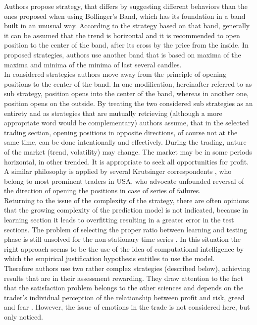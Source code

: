 \documentclass{tewiart}
\begin{document}
Authors propose strategy, that differs by suggesting different behaviors than the ones proposed when using Bollinger's Band, which has its foundation in a band built in an unusual way. According to the strategy based on that band, generally it can be assumed that the trend is horizontal and it is recommended to open position to the center of the band, after its cross by the price from the inside. In proposed strategies, authors use another band that is based on maxima of the maxima and minima of the minima of last several candles.\\

In considered strategies authors move away from the principle of opening positions to the center of the band. In one modification, hereinafter referred to as sub strategy, position opens into the center of the band, whereas in another one, position opens on the outside. By treating the two considered sub strategies as an entirety and as strategies that are mutually retrieving (although a more appropriate word would be complementary) authors assume, that in the selected trading section, opening positions in opposite directions, of course not at the same time, can be done intentionally and effectively. During the trading, nature of the market (trend, volatility) may change. The market may be in some periods horizontal, in other trended. It is appropriate to seek all opportunities for profit. A similar philosophy is applied by several Krutsinger correspondents \cite{Krutsinger}, who belong to most prominent traders in USA, who advocate unfounded reversal of the direction of opening the positions in case of series of failures.\\

Returning to the issue of the complexity of the strategy, there are often opinions that the growing complexity of the prediction model is not indicated, because in learning section it  leads to overfitting \cite{Murphy, Cai, Fujimoto}  resulting in a greater error in the test sections. The problem of selecting the proper ratio between learning and testing phase is still unsolved for the non-stationary time series \cite{Ball, Ivakhnenko}. In this situation the right approach seems to be the use of the idea of computational intelligence \cite{Polya, Pedrycz} by which the empirical justification hypothesis entitles to use the model.\\

Therefore authors use two rather complex strategies (described below), achieving results that are in their assessment rewarding. They draw attention to the fact that the satisfaction problem belongs to the other sciences and depends on the trader's individual perception of the relationship between profit and risk, greed and fear \cite{Kahneman}. However, the issue of emotions in the trade is not considered here, but only noticed.\\
\end{document}
